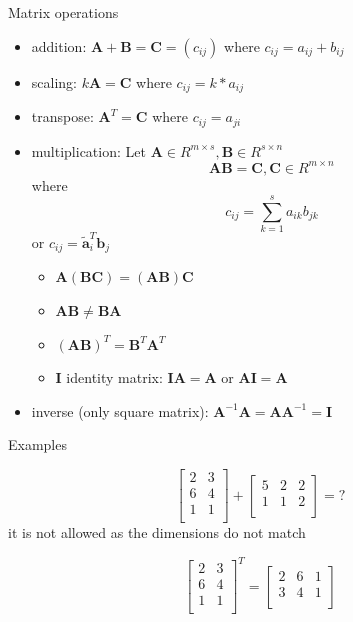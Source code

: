 \documentclass[ignorenonframetext,]{beamer}
\providecommand{\tightlist}{%
  \setlength{\itemsep}{0pt}\setlength{\parskip}{0pt}}
\newcommand{\vv}[1]{\boldsymbol{#1}}
\begin{document}
\begin{frame}{Matrix operations}
\protect\hypertarget{matrix-operations}{}

\begin{itemize}
\tightlist
\item
  addition: \(\vv{A} +\vv{B} =\vv{C}=(c_{ij})\) where
  \(c_{ij} = a_{ij} +b_{ij}\)
\item
  scaling: \(k\vv{A}= \vv{C}\) where \(c_{ij} =k* a_{ij}\)
\item
  transpose: \(\vv{A}^T = \vv{C}\) where \(c_{ij} = a_{ji}\)
\item
  multiplication: Let
  \(\vv{A}\in R^{m\times s}, \vv{B} \in R^{s\times n}\)
  \[\vv{AB} = \vv{C}, \vv{C} \in R^{m\times n}\] where
  \[c_{ij} = \sum_{k=1}^s a_{ik}b_{jk}\] or
  \(c_{ij} = \vv{\tilde{a}}_i^T\vv{b}_j\)

  \begin{itemize}
  \tightlist
  \item
    \(\vv{A}(\vv{BC}) =(\vv{AB})\vv{C}\)
  \item
    \(\vv{AB} \neq \vv{BA}\)
  \item
    \((\vv{AB})^T = \vv{B}^T \vv{A}^T\)
  \item
    \(\vv{I}\) identity matrix: \(\vv{I}\vv{A} = \vv{A}\) or
    \(\vv{AI}=\vv{A}\)
  \end{itemize}
\item
  inverse (only square matrix):
  \(\vv{A}^{-1} \vv{A}= \vv{AA}^{-1} =\vv{I}\)
\end{itemize}

\end{frame}

\begin{frame}{Examples}
\protect\hypertarget{examples}{}

\[
\begin{bmatrix}2&3 \\6&4 \\1&1 \\\end{bmatrix} + \begin{bmatrix}5&2&2 \\1&1&2 \\\end{bmatrix}  = ?
\] \pause it is not allowed as the dimensions do not match

\[
\begin{bmatrix}2&3 \\6&4 \\1&1 \\\end{bmatrix}^T   = \begin{bmatrix}2&6&1 \\3&4&1 \\\end{bmatrix}
\]

\end{frame}
\end{document}
